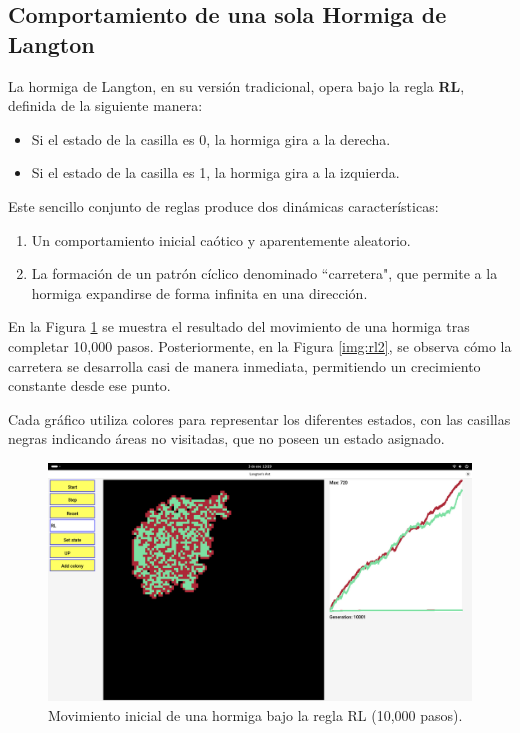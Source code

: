 \documentclass[12pt,twoside]{article}
\begin{document}
\subsection{Comportamiento de una sola Hormiga de Langton}

La hormiga de Langton, en su versión tradicional, opera bajo la regla \textbf{RL}, definida de la siguiente manera:  
\begin{itemize}
	\item Si el estado de la casilla es 0, la hormiga gira a la derecha.  
	\item Si el estado de la casilla es 1, la hormiga gira a la izquierda.  
\end{itemize}

Este sencillo conjunto de reglas produce dos dinámicas características:  
\begin{enumerate}
	\item Un comportamiento inicial caótico y aparentemente aleatorio.  
	\item La formación de un patrón cíclico denominado ``carretera", que permite a la hormiga expandirse de forma infinita en una dirección.  
\end{enumerate}

En la Figura \ref{img:rl1} se muestra el resultado del movimiento de una hormiga tras completar 10,000 pasos. Posteriormente, en la Figura \ref{img:rl2}, se observa cómo la carretera se desarrolla casi de manera inmediata, permitiendo un crecimiento constante desde ese punto. 

Cada gráfico utiliza colores para representar los diferentes estados, con las casillas negras indicando áreas no visitadas, que no poseen un estado asignado.

\begin{figure}[H]
	\centering
	\includegraphics[width=\textwidth]{img/rl1.png}
	\caption{Movimiento inicial de una hormiga bajo la regla RL (10,000 pasos).}
	\label{img:rl1}
\end{figure}
\end{document}
